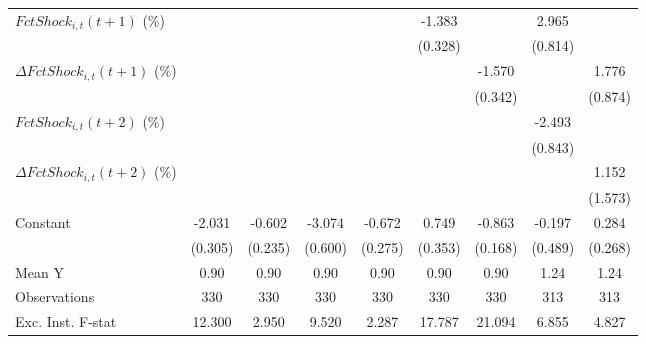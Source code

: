 {\begin{tabular}{l*{8}{c}}
\addlinespace
$ FctShock_{i,t}(t+1)$ (\%)&                     &                     &                     &                     &      -1.383\sym{***}&                     &       2.965\sym{***}&                     \\
                    &                     &                     &                     &                     &     (0.328)         &                     &     (0.814)         &                     \\
\addlinespace
$ \Delta FctShock_{i,t}(t+1)$ (\%)&                     &                     &                     &                     &                     &      -1.570\sym{***}&                     &       1.776\sym{*}  \\
                    &                     &                     &                     &                     &                     &     (0.342)         &                     &     (0.874)         \\
\addlinespace
$ FctShock_{i,t}(t+2)$ (\%)&                     &                     &                     &                     &                     &                     &      -2.493\sym{***}&                     \\
                    &                     &                     &                     &                     &                     &                     &     (0.843)         &                     \\
\addlinespace
$ \Delta FctShock_{i,t}(t+2)$ (\%)&                     &                     &                     &                     &                     &                     &                     &       1.152         \\
                    &                     &                     &                     &                     &                     &                     &                     &     (1.573)         \\
\addlinespace
Constant            &      -2.031\sym{***}&      -0.602\sym{**} &      -3.074\sym{***}&      -0.672\sym{**} &       0.749\sym{**} &      -0.863\sym{***}&      -0.197         &       0.284         \\
                    &     (0.305)         &     (0.235)         &     (0.600)         &     (0.275)         &     (0.353)         &     (0.168)         &     (0.489)         &     (0.268)         \\
\midrule
Mean Y              &        0.90         &        0.90         &        0.90         &        0.90         &        0.90         &        0.90         &        1.24         &        1.24         \\
Observations        &         330         &         330         &         330         &         330         &         330         &         330         &         313         &         313         \\
Exc. Inst. F-stat   &      12.300         &       2.950         &       9.520         &       2.287         &      17.787         &      21.094         &       6.855         &       4.827         \\
\bottomrule
\end{tabular}
}
